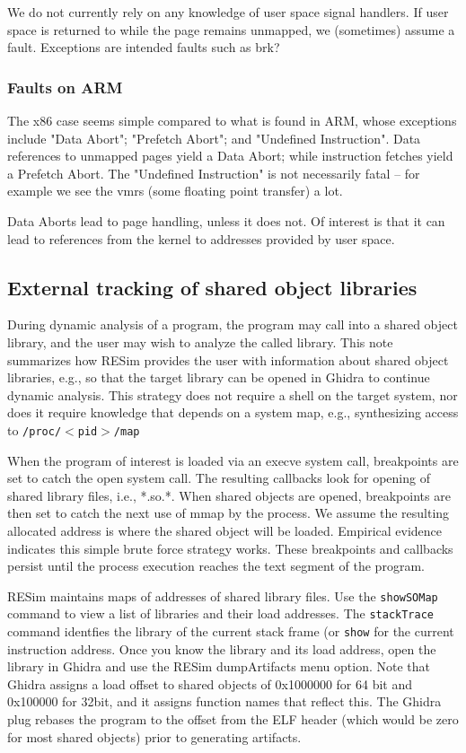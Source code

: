 \documentclass[titlepage]{article}
\begin{document}
\begin{appendices}
We do not currently rely on any knowledge of user space signal handlers.  If user space is returned to while the page remains unmapped, we (sometimes) assume a fault.
Exceptions are intended faults such as brk?

\subsubsection{Faults on ARM}
The x86 case seems simple compared to what is found in ARM, whose exceptions include "Data Abort"; "Prefetch Abort"; and "Undefined Instruction".  
Data references to unmapped pages yield a Data Abort; while instruction fetches yield a Prefetch Abort.  The "Undefined Instruction" is not necessarily fatal --
for example we see the vmrs (some floating point transfer) a lot.

Data Aborts lead to page handling, unless it does not.  Of interest is that it can lead to references from the kernel to addresses provided by user space.

\subsection{External tracking of shared object libraries}
\label{shared-libraries}
During dynamic analysis of a program, the program may call into a shared object library, and the user may wish to analyze the called library.  This note summarizes how RESim provides the user with information about shared object libraries, e.g., so that the target library can be opened in Ghidra to continue dynamic analysis.  This strategy does not require a shell on the target system, nor does it require knowledge that depends on a system map, e.g., 
synthesizing access to {\tt /proc/$<$pid$>$/map}

When the program of interest is loaded via an execve system call, breakpoints are set to catch the open system call.  The resulting callbacks look for opening of shared library files, i.e., *.so.*.   When shared objects are opened, breakpoints are then set to catch the next use of mmap by the process.  We assume the resulting allocated address is where the shared object will be loaded.  Empirical evidence indicates this simple brute force strategy works.  These breakpoints and callbacks persist until the process execution reaches the text segment of the program.

RESim maintains maps of addresses of shared library files.  Use the {\tt showSOMap} command to view a list of libraries and their load
addresses.  The {\tt stackTrace} command identfies the library of the current stack frame (or {\tt show} for the current instruction address.
Once you know the library and its load address, open the library in Ghidra and use the RESim dumpArtifacts menu option.  Note that Ghidra assigns a load offset to shared objects of 0x1000000 for 64 bit and 0x100000 for 32bit, and it assigns function names that reflect this. The Ghidra plug rebases the program to the offset from the ELF
header (which would be zero for most shared objects) prior to generating artifacts.   


\end{appendices}
\end{document}
